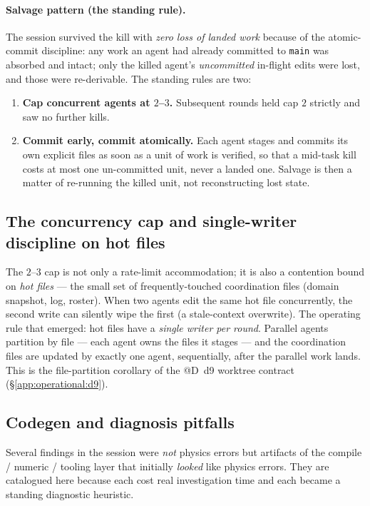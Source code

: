 \paragraph{Salvage pattern (the standing rule).}
The session survived the kill with \emph{zero loss of landed work}
because of the atomic-commit discipline: any work an agent had already
committed to \texttt{main} was absorbed and intact; only the killed
agent's \emph{uncommitted} in-flight edits were lost, and those were
re-derivable. The standing rules are two:
\begin{enumerate}
  \item \textbf{Cap concurrent agents at $2$--$3$.} Subsequent rounds
        held cap $2$ strictly and saw no further kills.
  \item \textbf{Commit early, commit atomically.} Each agent stages and
        commits its own explicit files as soon as a unit of work is
        verified, so that a mid-task kill costs at most one
        un-committed unit, never a landed one. Salvage is then a matter
        of re-running the killed unit, not reconstructing lost state.
\end{enumerate}

\subsection{The concurrency cap and single-writer discipline on hot files}
\label{app:operational:concurrency}

The $2$--$3$ cap is not only a rate-limit accommodation; it is also a
contention bound on \emph{hot files} --- the small set of
frequently-touched coordination files (domain snapshot, log,
roster). When two agents edit the same hot file concurrently, the second
write can silently wipe the first (a stale-context overwrite). The
operating rule that emerged: hot files have a \emph{single writer per
round}. Parallel agents partition by file --- each agent owns the files
it stages --- and the coordination files are updated by exactly one
agent, sequentially, after the parallel work lands. This is the
file-partition corollary of the @D~d9 worktree contract
(\S\ref{app:operational:d9}).

\subsection{Codegen and diagnosis pitfalls}
\label{app:operational:codegen}

Several findings in the session were \emph{not} physics errors but
artifacts of the compile / numeric / tooling layer that initially
\emph{looked} like physics errors. They are catalogued here because each
cost real investigation time and each became a standing diagnostic
heuristic.

